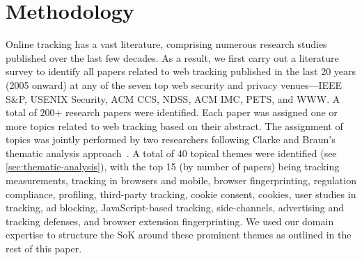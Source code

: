 \section{Methodology}
\label{sec:methodology}

Online tracking has a vast literature, comprising numerous research studies published over the last few decades.
%
As a result, we first carry out a literature survey to identify all papers related to web tracking published in the last 20 years (2005 onward) at any of the seven top web security and privacy venues---IEEE S\&P, USENIX Security, ACM CCS, NDSS, ACM IMC, PETS, and WWW.
%
A total of 200+ research papers were identified. 
%
Each paper was assigned one or more topics related to web tracking based on their abstract. 
%
The assignment of topics was jointly performed by two researchers following Clarke and Braun’s thematic analysis approach~\cite{clarke2013successful}.
%
A total of 40 topical themes were identified (see \autoref{sec:thematic-analysis}), with the top 15 (by number of papers) being tracking measurements, tracking in browsers and mobile, browser fingerprinting, regulation compliance, profiling, third-party tracking, cookie consent, cookies, user studies in tracking, ad blocking, JavaScript-based tracking, side-channels, advertising and tracking defenses, and browser extension fingerprinting.
%
We used our domain expertise to structure the SoK around these prominent themes as outlined in the rest of this paper. 


